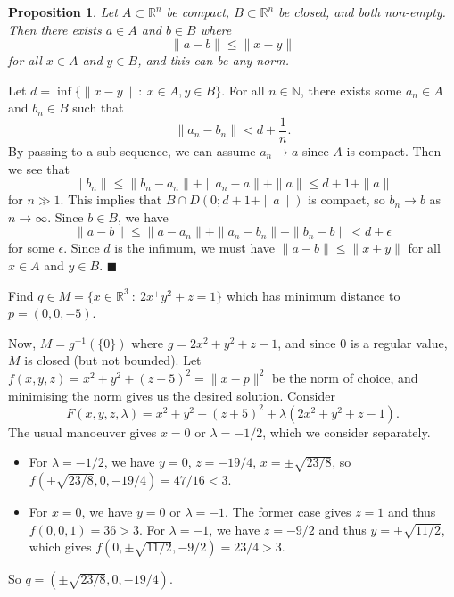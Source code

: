 \documentclass[letter-paper]{tufte-book}
\newtheorem{proposition}[theorem]{\color{pastel-blue}Proposition}
\newenvironment{proof}[1][Proof]{\begin{trivlist}
\item[\hskip \labelsep {\bfseries #1}]}{\end{trivlist}}
\newenvironment{example}[1][Example]{\begin{trivlist}
\item[\hskip \labelsep {\bfseries #1}]}{\end{trivlist}}
\newcommand{\qed}{\hfill$\blacksquare$}
\begin{document}
\begin{proposition}
  Let $A \subset \mathbb{R}^n$ be compact, $B \subset \mathbb{R}^n$ be closed,
  and both non-empty. Then there exists $a \in A$ and $b \in B$ where
  \begin{equation*}
    \|a - b\| \leq \|x - y\|
  \end{equation*}
  for all $x \in A$ and $y \in B$, and this can be any norm.
\end{proposition}

\begin{proof}
  Let $d = \inf \{\|x - y\|\ : \ x\in A, y \in B\}$. For all $n \in \mathbb{N}$,
  there exists some $a_n \in A$ and $b_n \in B$ such that
  \begin{equation*}
    \|a_n - b_n\| < d + \frac{1}{n}.
  \end{equation*}
  By passing to a sub-sequence, we can assume $a_n \to a$ since $A$ is compact.
  Then we see that
  \begin{equation*}
    \|b_n\| \leq \|b_n - a_n\| + \|a_n - a\| + \|a\| \leq d + 1 + \|a\|
  \end{equation*}
  for $n\gg1$. This implies that $B \cap D(0; d + 1 + \|a\|)$ is compact, so
  $b_n \to b$ as $n\to \infty$. Since $b \in B$, we have
  \begin{equation*}
    \|a - b\| \leq \|a - a_n\| + \|a_n - b_n\| + \|b_n - b\| < d + \epsilon
  \end{equation*}
  for some $\epsilon$. Since $d$ is the infimum, we must have $\|a - b\| \leq
  \|x + y\|$ for all $x \in A$ and $y \in B$. \qed
\end{proof}

\begin{example}
  Find $q \in M = \{x \in \mathbb{R}^3\ : \ 2x^ + y^2 + z = 1\}$ which has
  minimum distance to $p = (0, 0, -5)$.
  
  Now, $M = g^{-1}(\{0\})$ where $g = 2x^2 + y^2 + z - 1$, and since $0$ is a
  regular value, $M$ is closed (but not bounded). Let $f(x,y,z) = x^2 + y^2 +
  (z+5)^2 = \|x - p\|^2$ be the norm of choice, and minimising the norm gives us
  the desired solution. Consider
  \begin{equation*}
    F(x,y,z,\lambda) = x^2 + y^2 + (z+5)^2 + \lambda (2x^2 + y^2 + z - 1).
  \end{equation*}
  The usual manoeuver gives $x=0$ or $\lambda = -1/2$, which we consider
  separately.
  \begin{itemize}
    \item For $\lambda = -1/2$, we have $y=0$, $z=-19/4$, $x = \pm\sqrt{23/8}$,
    so $f(\pm\sqrt{23/8}, 0, -19/4) = 47/16 < 3$.
    
    \item For $x=0$, we have $y=0$ or $\lambda=-1$. The former case gives $z=1$
    and thus $f(0,0,1) = 36 > 3$. For $\lambda=-1$, we have $z=-9/2$ and thus
    $y=\pm\sqrt{11/2}$, which gives $f(0, \pm\sqrt{11/2}, -9/2) = 23/4 > 3$.
  \end{itemize}
  So $q = (\pm\sqrt{23/8}, 0, -19/4)$.
\end{example}
\end{document}
